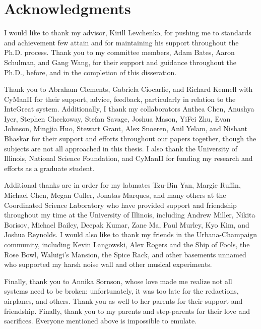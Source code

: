 \chapter*{Acknowledgments}

I would like to thank my advisor, Kirill Levchenko, for pushing me to standards and achievement few attain and for maintaining his support throughout the Ph.D. process.
Thank you to my committee members, Adam Bates, Aaron Schulman, and Gang Wang, for their support and guidance throughout the Ph.D., before, and in the completion of this disseration.

Thank you to Abraham Clements, Gabriela Ciocarlie, and Richard Kennell with CyManII for their support, advice, feedback, particularly in relation to the InteGreat system.
Additionally, I thank my collaborators Anthea Chen, Anushya Iyer, Stephen Checkoway, Stefan Savage, Joshua Mason, YiFei Zhu, Evan Johnson, Mingjia Huo, Stewart Grant, Alex Snoeren, Anil Yelam, and Nishant Bhaskar for their support and efforts throughout our papers together, though the subjects are not all approached in this thesis.
I also thank the University of Illinois, National Science Foundation, and CyManII for funding my research and efforts as a graduate student.

Additional thanks are in order for my labmates Tzu-Bin Yan, Margie Ruffin, Michael Chen, Megan Culler, Jonatas Marques, and many others at the Coordinated Science Laboratory who have provided support and friendship throughout my time at the University of Illinois, including Andrew Miller, Nikita Borisov, Michael Bailey, Deepak Kumar, Zane Ma, Paul Murley, Kyo Kim, and Joshua Reynolds.
I would also like to thank my friends in the Urbana-Champaign community, including Kevin Langowski, Alex Rogers and the Ship of Fools, the Rose Bowl, Waluigi's Mansion, the Spice Rack, and other basements unnamed who supported my harsh noise wall and other musical experiments.

Finally, thank you to Annika Sornson, whose love made me realize not all systems need to be broken: unfortunately, it was too late for the redactions, airplanes, and others.
Thank you as well to her parents for their support and friendship.
Finally, thank you to my parents and step-parents for their love and sacrifices.
Everyone mentioned above is impossible to emulate.

